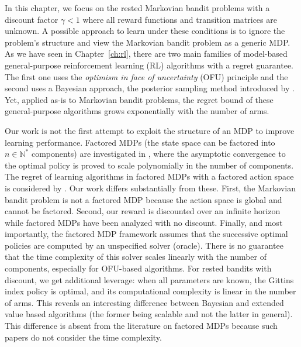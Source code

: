 In this chapter, we focus on the rested Markovian bandit problems with a discount factor $\gamma<1$ where all
reward functions and transition matrices are unknown.
A possible approach to learn under these conditions is to ignore the problem's structure and view the Markovian bandit problem as a generic MDP.
As we have seen in Chapter~\ref{ch:rl}, there are two main families of model-based general-purpose reinforcement learning (RL) algorithms with a regret guarantee.
The first one uses the \emph{optimism in face of uncertainty} (OFU) principle and the second uses a Bayesian approach, the posterior sampling method introduced by \cite{thompson1933likelihood}.
Yet, applied as-is to Markovian bandit problems, the regret bound of these general-purpose algorithms grows exponentially with the number of arms.

Our work is not the first attempt to exploit the structure of an MDP to improve learning performance.
Factored MDPs (the state space can be factored into $n\in\mathbb{N}^*$ components) are investigated in
\cite{guestrin2003efficient}, where the asymptotic convergence to
the optimal policy is proved to scale polynomially in the number of components.
The regret of learning algorithms in factored MDPs with a factored action space is considered by 
\cite{tian2020towards,rosenberg2020oracle,xu2020reinforcement,osband2014near}.
Our work differs substantially from these. 
First, the Markovian bandit problem is not a factored MDP because the action space is global and cannot be factored. 
Second, our reward is discounted over an infinite horizon while factored MDPs have been analyzed with no discount.
Finally, and most importantly, the factored MDP framework assumes that the successive optimal policies are computed by an unspecified solver (oracle). There is no guarantee that the time complexity of this solver scales linearly with the number of components, especially for OFU-based algorithms.
For rested bandits with discount, we get additional leverage: when all parameters are known, the Gittins index policy is optimal, and its computational complexity is linear in the number of arms. This reveals an interesting difference between Bayesian and extended value based algorithms (the former being scalable and not the latter in general). This difference is absent from the literature on factored MDPs because such papers do not consider the time complexity.

